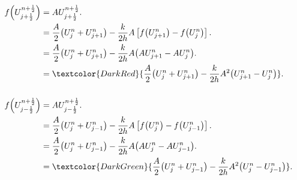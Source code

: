 \begin{frame}
  \frametitle{\secname}

  \begin{proofs}
    \begin{align*}
      f
      \Big(
      U_{j+\frac{1}{2}}^{n+\frac{1}{2}}
      \Big) & =
      AU_{j+\frac{1}{2}}^{n+\frac{1}{2}}. \\
            & =
      \frac{A}{2}
      \big(
      U^{n}_{j}+
      U^{n}_{j+1}
      \big)-
      \frac{k}{2h}
      A
      \left[
        f
        \big(U^{n}_{j+1}\big)-
        f
        \big(U^{n}_{j}\big)
      \right].                            \\
            & =
      \frac{A}{2}
      \big(
      U^{n}_{j}+
      U^{n}_{j+1}
      \big)-
      \frac{k}{2h}
      A
      \big(
      AU^{n}_{j+1}-
      AU^{n}_{j}
      \big).                              \\
            & =
      \textcolor{DarkRed}{
        \frac{A}{2}
        \big(
        U^{n}_{j}+
        U^{n}_{j+1}
        \big)-
        \frac{k}{2h}
        A^{2}
        \big(
        U^{n}_{j+1}-
        U^{n}_{j}
      \big)}.                             \\[\baselineskip]
      f
      \Big(
      U_{j-\frac{1}{2}}^{n+\frac{1}{2}}
      \Big) & =
      AU_{j-\frac{1}{2}}^{n+\frac{1}{2}}. \\
            & =
      \frac{A}{2}
      \big(
      U^{n}_{j}+
      U^{n}_{j-1}
      \big)-
      \frac{k}{2h}
      A
      \left[
        f
        \big(U^{n}_{j}\big)-
        f
        \big(U^{n}_{j-1}\big)
      \right].                            \\
            & =
      \frac{A}{2}
      \big(
      U^{n}_{j}+
      U^{n}_{j-1}
      \big)-
      \frac{k}{2h}
      A
      \big(
      AU^{n}_{j}-
      AU^{n}_{j-1}
      \big).                              \\
            & =
      \textcolor{DarkGreen}{
        \frac{A}{2}
        \big(
        U^{n}_{j}+
        U^{n}_{j-1}
        \big)-
        \frac{k}{2h}
        A^{2}
        \big(
        U^{n}_{j}-
        U^{n}_{j-1}
        \big)}.
    \end{align*}
  \end{proofs}
\end{frame}


